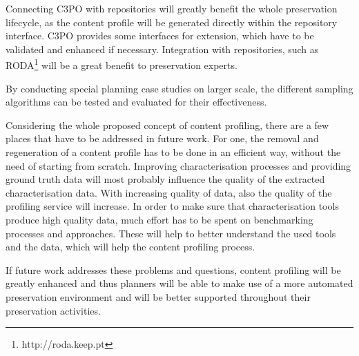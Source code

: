 Connecting C3PO with repositories will greatly benefit the whole preservation lifecycle, as the content profile will be generated directly within the repository interface. C3PO provides some interfaces for extension, which have to be validated and enhanced if necessary. Integration with repositories, such as RODA\footnote{http://roda.keep.pt} will be a great benefit to preservation experts.

By conducting special planning case studies on larger scale, the different sampling algorithms can be tested and evaluated for their effectiveness.

Considering the whole proposed concept of content profiling, there are a few places that have to be addressed in future work. For one, the removal and regeneration of a content profile has to be done in an efficient way, without the need of starting from scratch. Improving characterisation processes and providing ground truth data will most probably influence the quality of the extracted characterisation data. With increasing quality of data, also the quality of the profiling service will increase. In order to make sure that characterisation tools produce high quality data, much effort has to be spent on benchmarking processes and approaches. These will help to better understand the used tools and the data, which will help the content profiling process. 

If future work addresses these problems and questions, content profiling will be greatly enhanced and thus planners will be able to make use of a more automated preservation environment and will be better supported throughout their preservation activities.	
